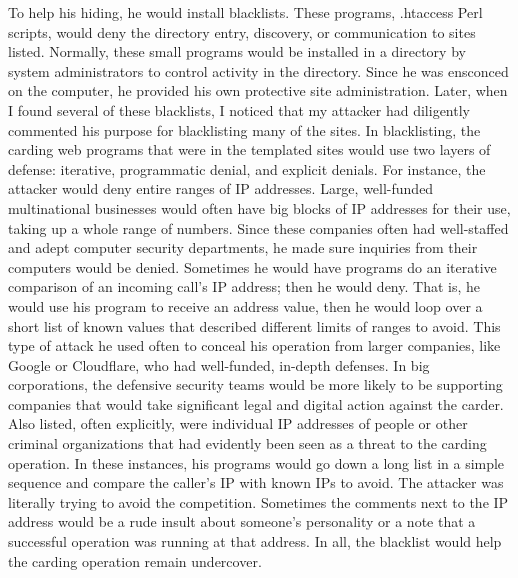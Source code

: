To help his hiding, he would install blacklists.  These programs, .htaccess Perl scripts, would deny the directory entry, discovery, or communication to sites listed.  Normally, these small programs would be installed in a directory by system administrators to control activity in the directory.  Since he was ensconced on the computer, he provided his own protective site administration.  Later, when I found several of these blacklists, I noticed that my attacker had diligently commented his purpose for blacklisting many of the sites.  In blacklisting, the carding web programs that were in the templated sites would use two layers of defense:  iterative, programmatic denial, and explicit denials.  For instance, the attacker would deny entire ranges of IP addresses.  Large, well-funded multinational businesses would often have big blocks of IP addresses for their use, taking up a whole range of numbers.  Since these companies often had well-staffed and adept computer security departments, he made sure inquiries from their computers would be denied.  Sometimes he would have programs do an iterative comparison of an incoming call's IP address; then he would deny.  That is, he would use his program to receive an address value, then he would loop over a short list of known values that described different limits of ranges to avoid.  This type of \gls{attack} he used often to conceal his operation from larger companies, like Google or Cloudflare, who had well-funded, in-depth defenses.  In big corporations, the defensive security teams would be more likely to be supporting companies that would take significant legal and digital action against the carder.  Also listed, often explicitly, were individual IP addresses of people or other criminal organizations that had evidently been seen as a \gls{threat} to the carding operation.  In these instances, his programs would go down a long list in a simple sequence and compare the caller's IP with known IPs to avoid.  The attacker was literally trying to avoid the competition.  Sometimes the comments next to the IP address would be a rude insult about someone's personality or a note that a successful operation was running at that address.  In all, the blacklist would help the carding operation remain undercover.

